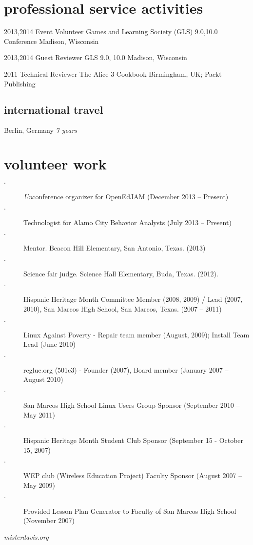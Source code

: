 \documentclass[hidelinks]{gnudon}
\begin{document}
\section{professional service activities}
\begin{entrylist}
\entry
{2013,2014}
{Event Volunteer}
{Games and Learning Society (GLS) 9.0,10.0 Conference}
{Madison, Wisconsin}

\entry
{2013,2014}
{Guest Reviewer}
{GLS 9.0, 10.0}
{Madison, Wisconsin}

\entry
{2011}
{Technical Reviewer}
{The Alice 3 Cookbook}
{Birmingham, UK; Packt Publishing}
\end{entrylist}

\begin{aside}
\section{{\color {red}int}ernational {\color {orange}tra}vel}
Berlin, Germany {\emph{7 years}}
\end{aside}
\section{volunteer work}
\begin{description}
\item[$\cdot$] {\emph{Un}}conference organizer for OpenEdJAM (December 2013 – Present)
\item[$\cdot$]Technologist for Alamo City Behavior Analysts (July 2013 – Present)
\item[$\cdot$]Mentor. Beacon Hill Elementary, San Antonio, Texas. (2013)
\item[$\cdot$]Science fair judge. Science Hall Elementary, Buda, Texas. (2012).
\item[$\cdot$]Hispanic Heritage Month Committee Member (2008, 2009) / Lead (2007, 2010), San Marcos High School, San Marcos, Texas. (2007 – 2011)
\item[$\cdot$]Linux Against Poverty  - Repair team member (August, 2009); Install Team Lead (June 2010)
\item[$\cdot$]reglue.org (501c3) - Founder (2007), Board member (January 2007 – August 2010)
\item[$\cdot$]San Marcos High School Linux Users Group Sponsor (September 2010 – May 2011)
\item[$\cdot$]Hispanic Heritage Month Student Club Sponsor (September 15 -  October 15, 2007)
\item[$\cdot$]WEP club (Wireless Education Project) Faculty Sponsor (August 2007 – May 2009)
\item[$\cdot$]Provided Lesson Plan Generator to Faculty of San Marcos High School (November 2007)
\end{description}


       {\emph{misterdavis.org}}
\end{document}
